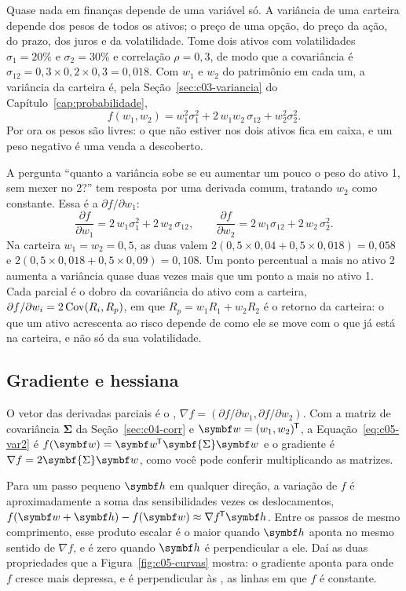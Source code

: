Quase nada em finanças depende de uma variável só. A variância de uma carteira depende dos pesos de todos os ativos; o preço de uma opção, do preço da ação, do prazo, dos juros e da volatilidade. Tome dois ativos com volatilidades $\sigma_1 = 20\%$ e $\sigma_2 = 30\%$ e correlação $\rho = 0,3$, de modo que a covariância é $\sigma_{12} = 0,3 \times 0,2 \times 0,3 = 0,018$. Com $w_1$ e $w_2$ do patrimônio em cada um, a variância da carteira é, pela Seção~\ref{sec:c03-variancia} do Capítulo~\ref{cap:probabilidade},
\begin{equation}
  f(w_1, w_2) = w_1^2\sigma_1^2 + 2\,w_1 w_2\,\sigma_{12} + w_2^2\sigma_2^2 .
  \label{eq:c05-var2}
\end{equation}
Por ora os pesos são livres: o que não estiver nos dois ativos fica em caixa, e um peso negativo é uma venda a descoberto.

A pergunta ``quanto a variância sobe se eu aumentar um pouco o peso do ativo 1, sem mexer no 2?'' tem resposta por uma derivada comum, tratando $w_2$ como constante. Essa é a  $\partial f/\partial w_1$:
\[
  \frac{\partial f}{\partial w_1} = 2\,w_1\sigma_1^2 + 2\,w_2\,\sigma_{12} ,
  \qquad
  \frac{\partial f}{\partial w_2} = 2\,w_1\sigma_{12} + 2\,w_2\,\sigma_2^2 .
\]
Na carteira $w_1 = w_2 = 0,5$, as duas valem $2(0,5 \times 0,04 + 0,5 \times 0,018) = 0,058$ e $2(0,5 \times 0,018 + 0,5 \times 0,09) = 0,108$. Um ponto percentual a mais no ativo 2 aumenta a variância quase duas vezes mais que um ponto a mais no ativo 1. Cada parcial é o dobro da covariância do ativo com a carteira, $\partial f/\partial w_i = 2\operatorname{Cov}(R_i, R_p)$, em que $R_p = w_1R_1 + w_2R_2$ é o retorno da carteira: o que um ativo acrescenta ao risco depende de como ele se move com o que já está na carteira, e não só da sua volatilidade.

\subsection{Gradiente e hessiana}
\label{sec:c05-gradiente}

O vetor das derivadas parciais é o , $\nabla f = (\partial f/\partial w_1, \partial f/\partial w_2)$. Com a matriz de covariância $\symbf{\Sigma}$ da Seção~\ref{sec:c04-corr} e $\vetor{w} = (w_1, w_2)\T$, a Equação~\eqref{eq:c05-var2} é $f(\vetor{w}) = \vetor{w}\T\symbf{\Sigma}\vetor{w}$ e o gradiente é $\nabla f = 2\symbf{\Sigma}\vetor{w}$, como você pode conferir multiplicando as matrizes.

Para um passo pequeno $\vetor{h}$ em qualquer direção, a variação de $f$ é aproximadamente a soma das sensibilidades vezes os deslocamentos, $f(\vetor{w} + \vetor{h}) - f(\vetor{w}) \approx \nabla f\T\vetor{h}$. Entre os passos de mesmo comprimento, esse produto escalar é o maior quando $\vetor{h}$ aponta no mesmo sentido de $\nabla f$, e é zero quando $\vetor{h}$ é perpendicular a ele. Daí as duas propriedades que a Figura~\ref{fig:c05-curvas} mostra: o gradiente aponta para onde $f$ cresce mais depressa, e é perpendicular às , as linhas em que $f$ é constante.

